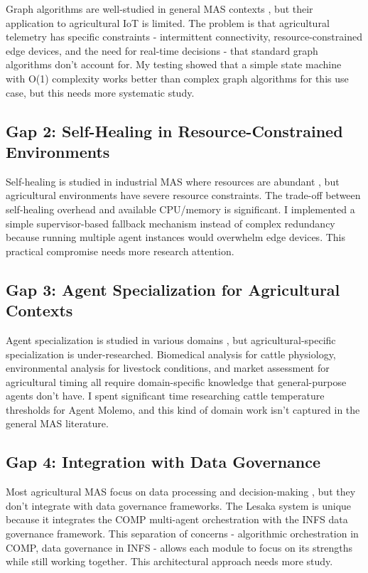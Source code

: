 Graph algorithms are well-studied in general MAS contexts \cite{diest2010graph}, but their application to agricultural IoT is limited. The problem is that agricultural telemetry has specific constraints - intermittent connectivity, resource-constrained edge devices, and the need for real-time decisions - that standard graph algorithms don't account for. My testing showed that a simple state machine with O(1) complexity works better than complex graph algorithms for this use case, but this needs more systematic study.

\subsection{Gap 2: Self-Healing in Resource-Constrained Environments}

Self-healing is studied in industrial MAS where resources are abundant \cite{ghosh2007self}, but agricultural environments have severe resource constraints. The trade-off between self-healing overhead and available CPU/memory is significant. I implemented a simple supervisor-based fallback mechanism instead of complex redundancy because running multiple agent instances would overwhelm edge devices. This practical compromise needs more research attention.

\subsection{Gap 3: Agent Specialization for Agricultural Contexts}

Agent specialization is studied in various domains \cite{luck2003agent}, but agricultural-specific specialization is under-researched. Biomedical analysis for cattle physiology, environmental analysis for livestock conditions, and market assessment for agricultural timing all require domain-specific knowledge that general-purpose agents don't have. I spent significant time researching cattle temperature thresholds for Agent Molemo, and this kind of domain work isn't captured in the general MAS literature.

\subsection{Gap 4: Integration with Data Governance}

Most agricultural MAS focus on data processing and decision-making \cite{riquelme2018smonitor}, but they don't integrate with data governance frameworks. The Lesaka system is unique because it integrates the COMP multi-agent orchestration with the INFS data governance framework. This separation of concerns - algorithmic orchestration in COMP, data governance in INFS - allows each module to focus on its strengths while still working together. This architectural approach needs more study.

